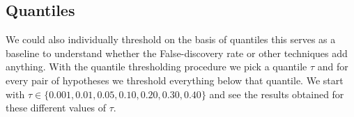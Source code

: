\documentclass{article}
\begin{document}
\subsection{Quantiles}

%
%

We could also individually threshold on the basis of quantiles
this serves as a baseline to understand whether the False-discovery
rate or other techniques add anything.  With the quantile
thresholding procedure we pick a quantile $\tau$ and for every
pair of hypotheses we threshold everything below that quantile.
We start with $\tau \in \{0.001, 0.01,0.05,0.10,0.20,0.30,0.40\}$
and see the results obtained for these different values 
of $\tau$.
\end{document}
